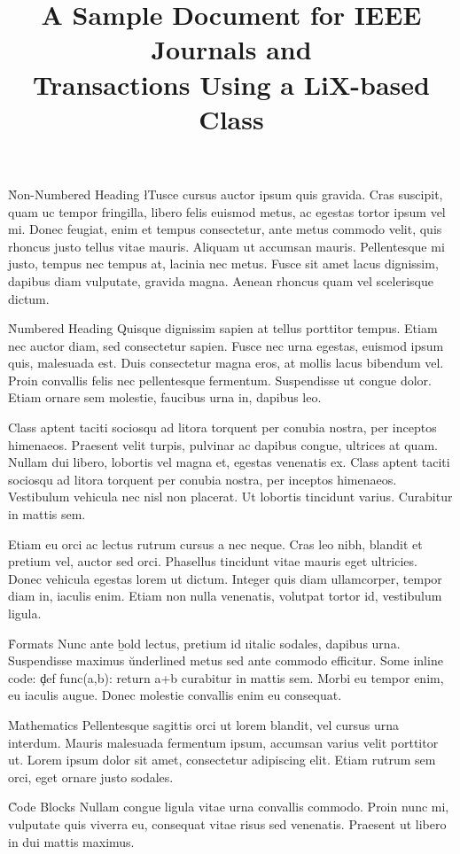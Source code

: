 \documentclass{ieee}
\title    {A Sample Document for IEEE Journals and \\
           Transactions Using a LiX-based Class}
\begin{document}
\h*{Non-Numbered Heading}
\l{T}usce cursus auctor ipsum quis gravida. Cras suscipit, quam uc tempor fringilla, libero felis euismod metus, ac egestas tortor ipsum vel mi. Donec feugiat, enim et tempus consectetur, ante metus commodo velit, quis rhoncus justo tellus vitae mauris. Aliquam ut accumsan mauris. Pellentesque mi justo, tempus nec tempus at, lacinia nec metus. Fusce sit amet lacus dignissim, dapibus diam vulputate, gravida magna. Aenean rhoncus quam vel scelerisque dictum.

\h{Numbered Heading}
Quisque dignissim sapien at tellus porttitor tempus. Etiam nec auctor diam, sed consectetur sapien. Fusce nec urna egestas, euismod ipsum quis, malesuada est. Duis consectetur magna eros, at mollis lacus bibendum vel. Proin convallis felis nec pellentesque fermentum. Suspendisse ut congue dolor. Etiam ornare sem molestie, faucibus urna in, dapibus leo.

Class aptent taciti sociosqu ad litora torquent per conubia nostra, per inceptos himenaeos. Praesent velit turpis, pulvinar ac dapibus congue, ultrices at quam. Nullam dui libero, lobortis vel magna et, egestas venenatis ex. Class aptent taciti sociosqu ad litora torquent per conubia nostra, per inceptos himenaeos. Vestibulum vehicula nec nisl non placerat. Ut lobortis tincidunt varius. Curabitur in mattis sem.

Etiam eu orci ac lectus rutrum cursus a nec neque. Cras leo nibh, blandit et pretium vel, auctor sed orci. Phasellus tincidunt vitae mauris eget ultricies. Donec vehicula egestas lorem ut dictum. Integer quis diam ullamcorper, tempor diam in, iaculis enim. Etiam non nulla venenatis, volutpat tortor id, vestibulum ligula.

\h{Formats}
Nunc ante \b{bold} lectus, pretium id \i{italic} sodales, dapibus  urna. Suspendisse maximus \u{underlined} metus sed ante commodo efficitur. Some inline code: \c{def func(a,b): return a+b} curabitur in mattis sem. Morbi eu tempor enim, eu iaculis augue. Donec molestie convallis enim eu consequat.

\h{Mathematics}
Pellentesque sagittis orci ut lorem blandit, vel cursus urna interdum. Mauris malesuada fermentum ipsum, accumsan varius velit porttitor ut. Lorem ipsum dolor sit amet, consectetur adipiscing elit. Etiam rutrum sem orci, eget ornare justo sodales.


\h{Code Blocks}
Nullam congue ligula vitae urna convallis commodo. Proin nunc mi, vulputate quis viverra eu, consequat vitae risus sed venenatis. Praesent ut libero in dui mattis maximus.
\end{document}

